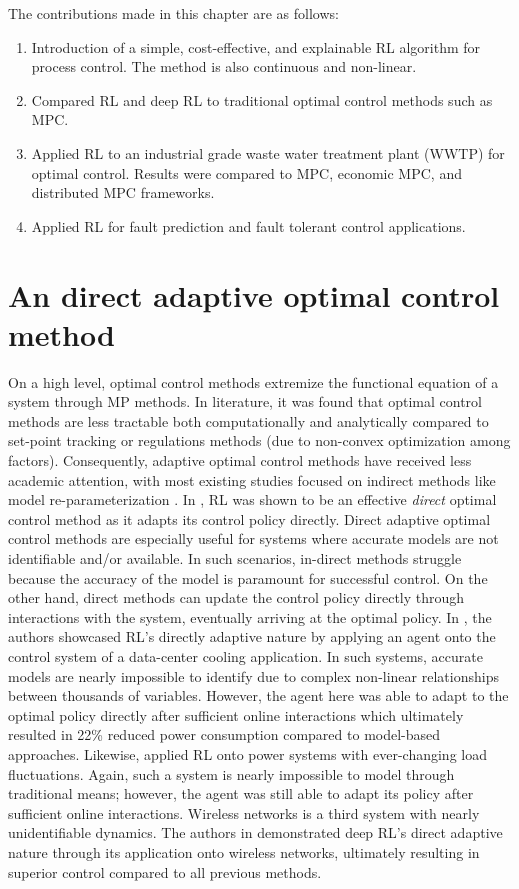 The contributions made in this chapter are as follows:
\begin{enumerate}
    \item Introduction of a simple, cost-effective, and explainable RL algorithm for process control.  The method is also continuous and non-linear.
    \item Compared RL and deep RL to traditional optimal control methods such as MPC.
    \item Applied RL to an industrial grade waste water treatment plant (WWTP) for optimal control.  Results were compared to MPC, economic MPC, and distributed MPC frameworks.
    \item Applied RL for fault prediction and fault tolerant control applications.
\end{enumerate}


\section{An direct adaptive optimal control method}
On a high level, optimal control methods extremize the functional equation of a system through MP methods. In literature, it was found that optimal control methods are less tractable both computationally and analytically compared to set-point tracking or regulations methods (due to non-convex optimization among factors). Consequently, adaptive optimal control methods have received less academic attention, with most existing studies focused on indirect methods like model re-parameterization \cite{rl_control}.  In \cite{rl_control}, RL was shown to be an effective \textit{direct} optimal control method as it adapts its control policy directly. Direct adaptive optimal control methods are especially useful for systems where accurate models are not identifiable and/or available.  In such scenarios, in-direct methods struggle because the accuracy of the model is paramount for successful control.  On the other hand, direct methods can update the control policy directly through interactions with the system, eventually arriving at the optimal policy. In \cite{power_control}, the authors showcased RL's directly adaptive nature by applying an agent onto the control system of a data-center cooling application. In such systems, accurate models are nearly impossible to identify due to complex non-linear relationships between thousands of variables. However, the agent here was able to adapt to the optimal policy directly after sufficient online interactions which ultimately resulted in 22\% reduced power consumption compared to model-based approaches.  Likewise, \cite{power_control2} applied RL onto power systems with ever-changing load fluctuations.  Again, such a system is nearly impossible to model through traditional means; however, the agent was still able to adapt its policy after sufficient online interactions. Wireless networks is a third system with nearly unidentifiable dynamics. The authors in \cite{power_control3} demonstrated deep RL's direct adaptive nature through its application onto wireless networks, ultimately resulting in superior control compared to all previous methods.

